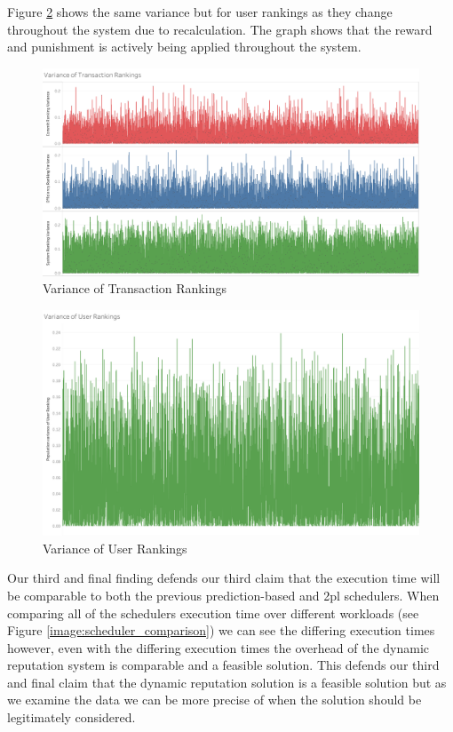Figure \ref{image:variance_of_user_rankings} shows the same variance but for user rankings as they change throughout the system due to recalculation. The graph shows that the reward and punishment is actively being applied throughout the system.

\begin{figure}
\centering
\includegraphics[scale=0.20]{images/VarianceofTransactionRankings.png}
\caption{Variance of Transaction Rankings}
\label{image:variance_of_transaction_rankings}
\end{figure}

\begin{figure}
\centering
\includegraphics[scale=0.20]{images/VarianceofUserRankings.png}
\caption{Variance of User Rankings}
\label{image:variance_of_user_rankings}
\end{figure}

Our third and final finding defends our third claim that the execution time will be comparable to both the previous prediction-based and \gls{2pl} schedulers. When comparing all of the schedulers execution time over different workloads (see Figure \ref{image:scheduler_comparison}) we can see the differing execution times however, even with the differing execution times the overhead of the dynamic reputation system is comparable and a feasible solution. This defends our third and final claim that the dynamic reputation solution is a feasible solution but as we examine the data we can be more precise of when the solution should be legitimately considered.

